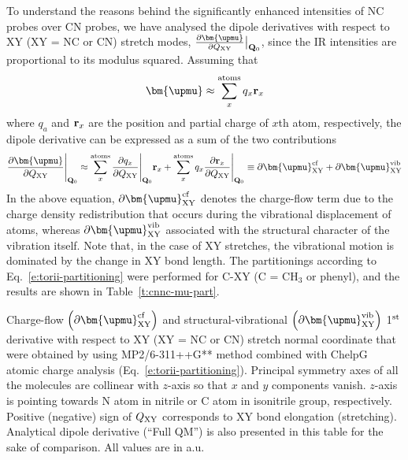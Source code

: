 \documentclass[b5paper,oneside,fleqn,11pt]{book}
\newcommand{\BM}[1]{\bm{#1}}
\newcommand{\fderiv}[2]{\ensuremath{
    \frac{\partial #1}{\partial #2}}}
\begin{document}
\begin{refsection}
To understand the reasons behind the significantly enhanced intensities of NC probes over
CN probes, we have analysed the dipole derivatives with respect to XY (XY = NC or CN) stretch
modes, $\fderiv{{\BM \upmu}}{Q_{\rm XY}} \big|_{{\bf Q}_{0}}$,
since the IR intensities are proportional to its modulus squared.
Assuming that
%
\begin{equation}
 {\BM \upmu} \approx \sum_x^{\rm atoms} q_x {\bf r}_x 
\end{equation}
%
where $q_a$ and ${\bf r}_x$ are the position and partial charge of $x$th atom, respectively,
the dipole derivative can be expressed as a sum of the two contributions
%
\begin{equation} \label{e:torii-partitioning}
 \fderiv{{\BM \upmu}}{Q_{\rm XY}} \Bigg|_{{\bf Q}_{0}} \approx
 \sum_x^{\rm atoms} \fderiv{q_x}{Q_{\rm XY}} \Bigg|_{{\bf Q}_{0}} {\bf r}_x 
  +
 \sum_x^{\rm atoms} q_x \fderiv{{\bf r}_x}{Q_{\rm XY}} \Bigg|_{{\bf Q}_{0}}
 \equiv 
 \partial {\BM \upmu}_{\rm XY}^{\rm cf} + \partial {\BM \upmu}_{\rm XY}^{\rm vib}
\end{equation}
%
In the above equation, $\partial {\BM \upmu}_{\rm XY}^{\rm cf}$ denotes the
charge\hyp{}flow term due to the charge density
redistribution that occurs during the vibrational displacement of atoms, 
whereas $\partial {\BM \upmu}_{\rm XY}^{\rm vib}$
associated with the structural character of the vibration itself. 
Note that, in the case of XY
stretches, the vibrational motion is dominated by the change 
in XY bond length. The 
partitionings according to Eq.~\eqref{e:torii-partitioning} 
were performed for C-XY (C = CH$_3$ or phenyl), and the 
results are shown in Table~\ref{t:cnnc-mu-part}.
%
\begin{table}[t!]
\caption{Charge\hyp{}flow $\left( \partial {\BM \upmu}_{\rm XY}^{\rm cf} \right)$
and structural\hyp{}vibrational $\left( \partial {\BM \upmu}_{\rm XY}^{\rm vib} \right)$
1$^{\rm st}$ derivative with respect to XY (XY = NC or CN) stretch normal coordinate 
that were obtained by using MP2/6-311++G** method combined with ChelpG atomic charge 
analysis (Eq.~\eqref{e:torii-partitioning}). 
Principal symmetry axes of all the molecules are collinear with $z$-axis so that $x$ and $y$ 
components vanish. $z$-axis is pointing towards N atom in nitrile or C atom in isonitrile group, 
respectively. Positive (negative) sign of $Q_{\rm XY}$ corresponds to XY bond elongation (stretching). 
Analytical dipole derivative (``Full QM'') is also presented in this table for the sake of 
comparison. All values are in a.u. 
\label{t:cnnc-mu-part}}

\end{table}
\end{refsection}
\end{document}
